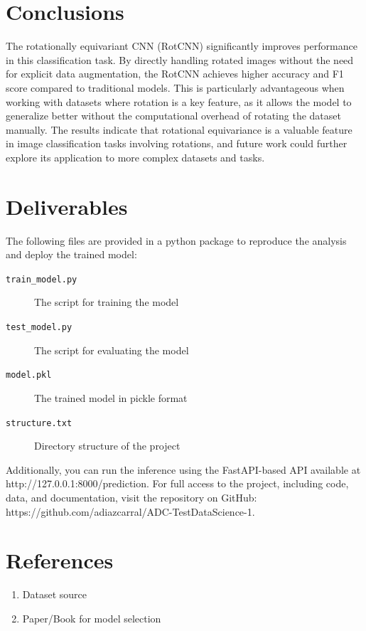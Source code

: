 \documentclass[12pt]{article}
\begin{document}
\section{Conclusions}
The rotationally equivariant CNN (RotCNN) significantly improves performance in this classification task. By directly handling rotated images without the need for explicit data augmentation, the RotCNN achieves higher accuracy and F1 score compared to traditional models. This is particularly advantageous when working with datasets where rotation is a key feature, as it allows the model to generalize better without the computational overhead of rotating the dataset manually. The results indicate that rotational equivariance is a valuable feature in image classification tasks involving rotations, and future work could further explore its application to more complex datasets and tasks.

\section{Deliverables}

The following files are provided in a python package to reproduce the analysis and deploy the trained model:

\begin{description}
    \item[\texttt{train\_model.py}] The script for training the model
    \item[\texttt{test\_model.py}] The script for evaluating the model
    \item[\texttt{model.pkl}] The trained model in pickle format
    \item[\texttt{structure.txt}] Directory structure of the project
\end{description}

Additionally, you can run the inference using the FastAPI-based API available at http://127.0.0.1:8000/prediction. For full access to the project, including code, data, and documentation, visit the repository on GitHub: https://github.com/adiazcarral/ADC-TestDataScience-1.

\section{References}
\begin{enumerate}
    \item Dataset source
    \item Paper/Book for model selection
\end{enumerate}
\end{document}
